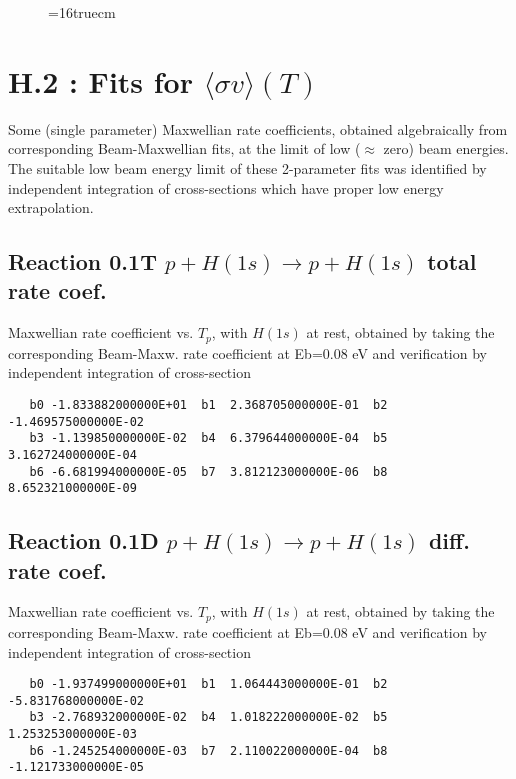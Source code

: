 \documentclass[12pt,dvipdfmx]{article}
\begin{document}
\begin{figure} \label{0.4}
\epsfxsize=16truecm
\end{figure}
\newpage

\section{H.2 : Fits for $\langle\sigma v \rangle (T)$} \label{sect2}

Some (single parameter) Maxwellian rate coefficients, obtained algebraically from corresponding
Beam-Maxwellian fits, at the limit of low ($\approx$ zero) beam energies. The suitable low beam energy limit
of these 2-parameter fits was identified by independent integration of cross-sections which have proper
low energy extrapolation.

\subsection{
Reaction 0.1T  $p + H(1s) \rightarrow p + H(1s)$ total rate coef.
}
Maxwellian rate coefficient vs. $T_p$, with $H(1s)$ at rest, obtained by taking
the corresponding Beam-Maxw. rate coefficient at Eb=0.08 eV and
verification by independent integration of cross-section

\begin{small}\begin{verbatim}
   b0 -1.833882000000E+01  b1  2.368705000000E-01  b2 -1.469575000000E-02
   b3 -1.139850000000E-02  b4  6.379644000000E-04  b5  3.162724000000E-04
   b6 -6.681994000000E-05  b7  3.812123000000E-06  b8  8.652321000000E-09
\end{verbatim}\end{small}


\subsection{
Reaction 0.1D  $p + H(1s) \rightarrow p + H(1s)$ diff. rate coef.
}
Maxwellian rate coefficient vs. $T_p$, with $H(1s)$ at rest, obtained by taking
the corresponding Beam-Maxw. rate coefficient at Eb=0.08 eV and
verification by independent integration of cross-section
\begin{small}\begin{verbatim}
   b0 -1.937499000000E+01  b1  1.064443000000E-01  b2 -5.831768000000E-02
   b3 -2.768932000000E-02  b4  1.018222000000E-02  b5  1.253253000000E-03
   b6 -1.245254000000E-03  b7  2.110022000000E-04  b8 -1.121733000000E-05
\end{verbatim}\end{small}
\end{document}
